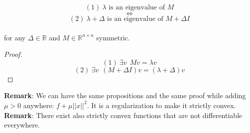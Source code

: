 \vspace{0.5cm}
\begin{property}
$$(1) \ \lambda \text{ is an eigenvalue of } M$$
$$\Leftrightarrow$$
$$(2) \ \lambda + \Delta \text{ is an eigenvalue of } M + \Delta I$$
\\for any $\Delta \in \mathbb{R}$ and $M \in \mathbb{R}^{n \times n}$ symmetric.
\end{property}
\begin{proof}
$$ (1) \ \exists v \: \ M v = \lambda v $$
$$(2) \ \exists v \: \ (M + \Delta I) v = ( \lambda + \Delta)v$$
\end{proof}
\textbf{Remark}: We can have the same propositions and the same proof while adding $\mu > 0$ anywhere: $ f + \mu ||x||^{2}$. It is a regularization to make it strictly convex.\\
\textbf{Remark}: There exist also strictly convex functions that are not differentiable everywhere.